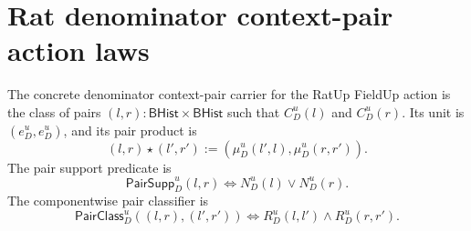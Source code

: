 \section{Rat denominator context-pair action laws}
\label{sec:field-rat-denominator-context-pair-action-laws}

\begin{definition}
\label{def:ratup-fieldup-denominator-context-pair-monoid}
The concrete denominator context-pair carrier for the RatUp FieldUp action is
the class of pairs $(l,r):\mathsf{BHist}\times\mathsf{BHist}$ such that
$C_D^u(l)$ and $C_D^u(r)$. Its unit is
$(e_D^u,e_D^u)$, and its pair product is
$$
(l,r)\star(l',r'):=(\mu_D^u(l',l),\mu_D^u(r,r')).
$$
The pair support predicate is
$$
\mathsf{PairSupp}_D^u(l,r)\Longleftrightarrow N_D^u(l)\lor N_D^u(r).
$$
The componentwise pair classifier is
$$
\mathsf{PairClass}_D^u((l,r),(l',r'))\Longleftrightarrow
R_D^u(l,l')\land R_D^u(r,r').
$$
\end{definition}

